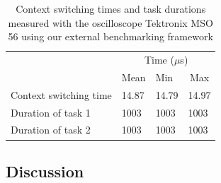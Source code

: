 \begin{table}[!ht]
  \centering
  \begin{tabular}{llll}
                        & \multicolumn{3}{c}{Time ($\mu$s)}                             \\ \cline{2-4} 
                        & \multicolumn{1}{c}{Mean} & Min  & \multicolumn{1}{c}{Max} \\ \cline{2-4} 
  Context switching time & 14.87                     & 14.79 & 14.97                    \\
  Duration of task 1    & 1003                     & 1003 & 1003                    \\
  Duration of task 2    & 1003                     & 1003 & 1003                   
  \end{tabular}
  \caption{Context switching times and task durations measured with the oscilloscope Tektronix MSO 56 using our external benchmarking framework}
  \label{tab:external-oscilloscope-framework-measurement}
\end{table}

\subsection{Discussion}
